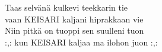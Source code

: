
            Taas selvänä kulkevi teekkarin tie \\
            vaan KEISARI kaljani hiprakkaan vie \\
            Niin pitkä on tuoppi sen suulleni tuon \\
            :,: kun KEISARI kaljaa ma ilohon juon :,: \\
